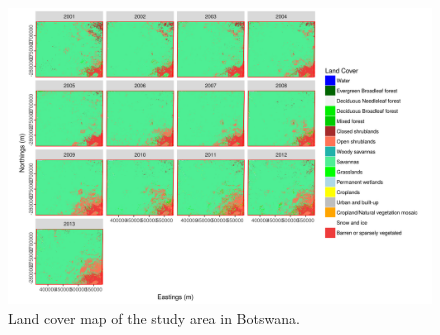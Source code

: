 \documentclass[12pt,a4paper, twoside, english]{article}
\begin{document}

\begin{figure}[H]
  \centering
  \includegraphics[width=\textwidth]{figures/Landcover_BWA.png}
  \caption[Land cover map of Ngamiland]{Land cover map of the study area in Botswana.}
  \label{fig:mlc_bwa}
\end{figure}



\end{document}
